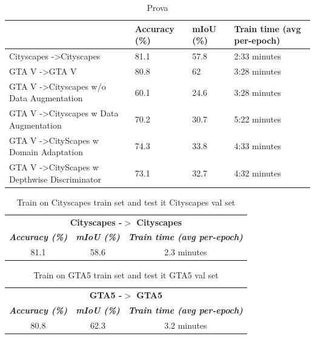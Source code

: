 \documentclass[conference]{IEEEtran}
\begin{document}
\begin{table}[]
\caption{Prova}
\label{TrainingTimaAndAccuracy}
\begin{tabular}{@{}llll@{}}
\toprule
                                                         & Accuracy (\%) & mIoU (\%) & Train time (avg per-epoch) \\ \midrule
Cityscapes -\textgreater Cityscapes                      & 81.1          & 57.8      & 2:33 minutes               \\
GTA V -\textgreater GTA V                                & 80.8          & 62        & 3:28 minutes               \\
GTA V -\textgreater Cityscapes w/o Data Augmentation     & 60.1          & 24.6      & 3:28 minutes               \\
GTA V -\textgreater Cityscapes w Data Augmentation       & 70.2          & 30.7      & 5:22 minutes               \\
GTA V -\textgreater CityScapes w Domain Adaptation       & 74.3          & 33.8      & 4:33 minutes               \\
GTA V -\textgreater CityScapes w Depthwise Discriminator & 73.1          & 32.7      & 4:32 minutes               \\ \bottomrule
\end{tabular}
\end{table}

\begin{table}[tb]
\caption{Train on Cityscapes train set and test it Cityscapes val set}
\begin{center}
\begin{tabular}{|c|c|c|}
\hline
\multicolumn{3}{|c|}{\textbf{Cityscapes -$>$ Cityscapes}} \\
\cline{1-3} 
\textbf{\textit{Accuracy (\%)}}& \textbf{\textit{mIoU (\%)}}& \textbf{\textit{Train time (avg per-epoch)}} \\
\hline
81.1& 58.6& 2.3 minutes   \\
\hline
\end{tabular}
\label{CityscapesToCityscapes}
\end{center}
\end{table}

\begin{table}[tb]
\caption{Train on GTA5 train set and test it GTA5 val set}
\begin{center}
\begin{tabular}{|c|c|c|}
\hline
\multicolumn{3}{|c|}{\textbf{GTA5 -$>$ GTA5}} \\
\cline{1-3} 
\textbf{\textit{Accuracy (\%)}}& \textbf{\textit{mIoU (\%)}}& \textbf{\textit{Train time (avg per-epoch)}} \\
\hline
80.8& 62.3& 3.2 minutes   \\
\hline
\end{tabular}
\label{GTATOGTA}
\end{center}
\end{table}
\end{document}
